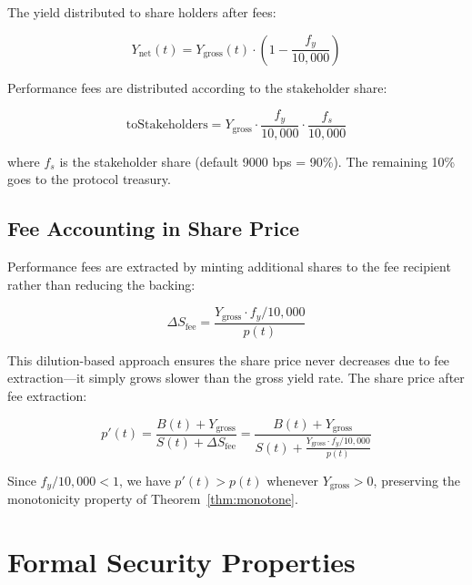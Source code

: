\documentclass[11pt,twocolumn]{article}
\begin{document}
The yield distributed to share holders after fees:

\begin{equation}\label{eq:net_yield}
  Y_{\text{net}}(t) = Y_{\text{gross}}(t) \cdot \left(1 - \frac{f_y}{10{,}000}\right)
\end{equation}

Performance fees are distributed according to the stakeholder share:

\begin{equation}\label{eq:fee_split}
  \text{toStakeholders} = Y_{\text{gross}} \cdot \frac{f_y}{10{,}000} \cdot \frac{f_s}{10{,}000}
\end{equation}

where $f_s$ is the stakeholder share (default 9000 bps = 90\%). The remaining 10\% goes to the protocol treasury.

\subsection{Fee Accounting in Share Price}

Performance fees are extracted by minting additional shares to the fee recipient rather than reducing the backing:

\begin{equation}\label{eq:fee_shares}
  \Delta S_{\text{fee}} = \frac{Y_{\text{gross}} \cdot f_y / 10{,}000}{p(t)}
\end{equation}

This dilution-based approach ensures the share price never decreases due to fee extraction---it simply grows slower than the gross yield rate. The share price after fee extraction:

\begin{equation}
  p'(t) = \frac{B(t) + Y_{\text{gross}}}{S(t) + \Delta S_{\text{fee}}} = \frac{B(t) + Y_{\text{gross}}}{S(t) + \frac{Y_{\text{gross}} \cdot f_y / 10{,}000}{p(t)}}
\end{equation}

Since $f_y / 10{,}000 < 1$, we have $p'(t) > p(t)$ whenever $Y_{\text{gross}} > 0$, preserving the monotonicity property of Theorem~\ref{thm:monotone}.

\section{Formal Security Properties}\label{sec:security}
\end{document}
